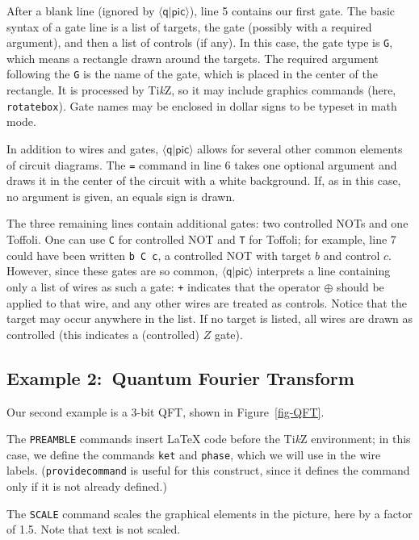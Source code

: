 \documentclass[twoside,12pt]{article}
\newcommand{\qpic}{$\langle\mathsf{q}|\mathsf{pic}\rangle$\xspace}
\newcommand{\TikZ}{Ti\emph{k}Z\xspace}
\begin{document}
After a blank line (ignored by \qpic), line 5 contains our first gate.
The basic syntax of a gate line is a list of targets, the gate (possibly
with a required argument), and then a list of controls (if any).  In this case,
the gate type is {\tt G}, which means a rectangle drawn around the targets.
The required argument following the {\tt G} is the name of the gate, which
is placed in the center of the rectangle.  It is processed by \TikZ, so it
may include graphics commands (here, {\tt {}rotatebox}).  Gate names
may be enclosed in dollar signs to be typeset in math mode.


In addition to wires and gates, \qpic allows for several other common
elements of circuit diagrams.  The {\tt =} command in line 6 takes one
optional argument and draws it in the center of the circuit with a white
background.  If, as in this case, no argument is given, an equals sign is
drawn.


The three remaining lines contain additional gates: two controlled NOTs and
one Toffoli.  One can use {\tt C} for controlled NOT and {\tt T} for
Toffoli; for example, line 7 could have been written {\tt b C c}, a
controlled NOT with target $b$ and control $c$.  However, since these gates
are so common, \qpic interprets a line containing only a list of wires as
such a gate:  {\tt +} indicates that the operator $\oplus$ should be
applied to that wire, and any other wires are treated as controls.
Notice that the target may occur anywhere in the list.  If no target is
listed, all wires are drawn as controlled (this indicates a (controlled)
$Z$ gate).

\subsection{Example 2:\ Quantum Fourier Transform}
\label{sec-example-QFT}

Our second example is a 3-bit QFT, shown in Figure~\ref{fig-QFT}.



The {\tt PREAMBLE} commands insert {\LaTeX} code before the
\TikZ environment; in this case, we define the commands {\tt {}ket}
and {\tt {}phase}, which we will use in the wire labels.
({\tt {}providecommand} is
useful for this construct, since it defines the command only if it is not
already defined.)



The {\tt SCALE} command scales the graphical elements in the picture,
here by a factor of 1.5.  Note that text is not scaled.
\end{document}
